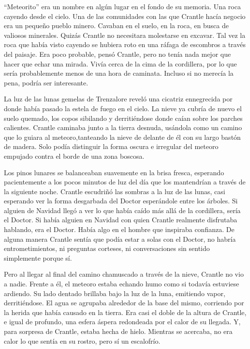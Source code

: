 ``Meteorito'' era un nombre en algún lugar en el fondo de su memoria. Una roca cayendo desde el cielo. Una de las comunidades con las que Crantle hacía negocio era un pequeño pueblo minero. Cavaban en el suelo, en la roca, en busca de valiosos minerales. Quizás Crantle no necesitara molestarse en excavar. Tal vez la roca que había visto cayendo se hubiera roto en una ráfaga de escombros a través del paisaje. Era poco probable, pensó Crantle, pero no tenía nada mejor que hacer que echar una mirada. Vivía cerca de la cima de la cordillera, por lo que sería probablemente menos de una hora de caminata. Incluso si no merecía la pena, podría ser interesante.



\mbox{}



La luz de las lunas gemelas de Trenzalore reveló una cicatriz ennegrecida por donde había pasado la estela de fuego en el cielo. La nieve ya cubría de nuevo el suelo quemado, los copos sibilando y derritiéndose donde caían sobre los parches calientes. Crantle caminaba junto a la tierra desnuda, usándola como un camino que lo guiara al meteoro,tanteando la nieve de delante de él con su largo bastón de madera. Solo podía distinguir la forma oscura e irregular del meteoro empujado contra el borde de una zona boscosa.



Los pinos lunares se balanceaban suavemente en la brisa fresca, esperando pacientemente a los pocos minutos de luz del día que los mantendrían a través de la siguiente noche. Crantle escudriñó las sombras a la luz de las lunas, casi esperando ver la forma desgarbada del Doctor esperándole entre los árboles. Si alguien de Navidad llegó a ver lo que había caído más allá de la cordillera, sería el Doctor. Si había alguien en Navidad con quien Crantle realmente disfrutaba hablando, era el Doctor. Había algo en el hombre que inspiraba confianza. De alguna manera Crantle sentía que podía estar a solas con el Doctor, no habría entrometimientos, ni preguntas corteses, ni conversaciones sin sentido simplemente porque sí.



Pero al llegar al final del camino chamuscado a través de la nieve, Crantle no vio a nadie. Frente a él, el meteoro estaba echando humo como si todavía estuviese ardiendo. Su lado dentado brillaba bajo la luz de la luna, emitiendo vapor, derritiéndose. El agua se agrupaba alrededor de la base del mismo, corriendo por la herida que había causado en la tierra. Era casi el doble de la altura de Crantle, e igual de profundo, una esfera áspera redondeada por el calor de su llegada. Y, para sorpresa de Crantle, estaba hecha de hielo. Mientras se acercaba, no era calor lo que sentía en su rostro, pero sí un escalofrío.



